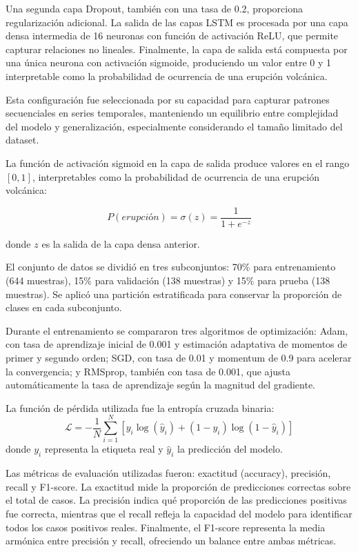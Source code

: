 \documentclass[conference]{IEEEtran}
\begin{document}
Una segunda capa Dropout, también con una tasa de 0.2, proporciona regularización adicional. La salida de las capas LSTM es procesada por una capa densa intermedia de 16 neuronas con función de activación ReLU, que permite capturar relaciones no lineales. Finalmente, la capa de salida está compuesta por una única neurona con activación sigmoide, produciendo un valor entre 0 y 1 interpretable como la probabilidad de ocurrencia de una erupción volcánica.

Esta configuración fue seleccionada por su capacidad para capturar patrones secuenciales en series temporales, manteniendo un equilibrio entre complejidad del modelo y generalización, especialmente considerando el tamaño limitado del dataset.


La función de activación sigmoid en la capa de salida produce valores en el rango $[0,1]$, interpretables como la probabilidad de ocurrencia de una erupción volcánica:

\begin{equation}
    P(erupción) = \sigma(z) = \frac{1}{1 + e^{-z}}
\end{equation}

donde $z$ es la salida de la capa densa anterior.

El conjunto de datos se dividió en tres subconjuntos: 70\% para entrenamiento (644 muestras), 15\% para validación (138 muestras) y 15\% para prueba (138 muestras). Se aplicó una partición estratificada para conservar la proporción de clases en cada subconjunto.

Durante el entrenamiento se compararon tres algoritmos de optimización: Adam, con tasa de aprendizaje inicial de 0.001 y estimación adaptativa de momentos de primer y segundo orden; SGD, con tasa de 0.01 y momentum de 0.9 para acelerar la convergencia; y RMSprop, también con tasa de 0.001, que ajusta automáticamente la tasa de aprendizaje según la magnitud del gradiente.

La función de pérdida utilizada fue la entropía cruzada binaria:
\begin{equation}
    \mathcal{L} = -\frac{1}{N} \sum_{i=1}^{N} [y_i \log(\hat{y}_i) + (1-y_i) \log(1-\hat{y}_i)]
\end{equation}
donde $y_i$ representa la etiqueta real y $\hat{y}_i$ la predicción del modelo.

Las métricas de evaluación utilizadas fueron: exactitud (accuracy), precisión, recall y F1-score. La exactitud mide la proporción de predicciones correctas sobre el total de casos. La precisión indica qué proporción de las predicciones positivas fue correcta, mientras que el recall refleja la capacidad del modelo para identificar todos los casos positivos reales. Finalmente, el F1-score representa la media armónica entre precisión y recall, ofreciendo un balance entre ambas métricas.
\end{document}
